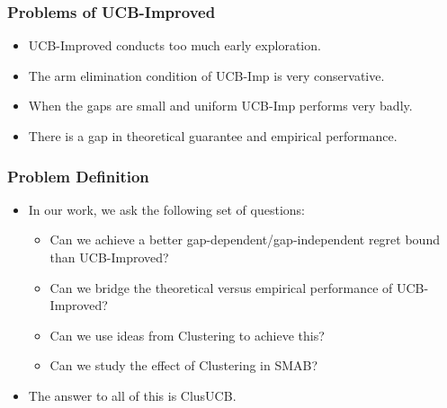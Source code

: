 \begin{frame}
\frametitle{Problems of UCB-Improved}
\begin{itemize}
\item<1-> UCB-Improved conducts too much early exploration.
\item<2-> The arm elimination condition of UCB-Imp is very conservative.
\item<3-> When the gaps are small and uniform UCB-Imp performs very badly.
\item<4-> There is a gap in theoretical guarantee and empirical performance.  
\end{itemize}
\end{frame}

\begin{frame}
\frametitle{Problem Definition}
\begin{itemize}
\item<1-> In our work, we ask the following set of questions:
\begin{itemize}
\item<2-> Can we achieve a better gap-dependent/gap-independent regret bound than UCB-Improved?
\item<3-> Can we bridge the theoretical versus empirical performance of UCB-Improved?
\item<4-> Can we use ideas from Clustering to achieve this?
\item<5-> Can we study the effect of Clustering in SMAB? 
\end{itemize} 
\item<6-> The answer to all of this is ClusUCB.
\end{itemize}
\end{frame}